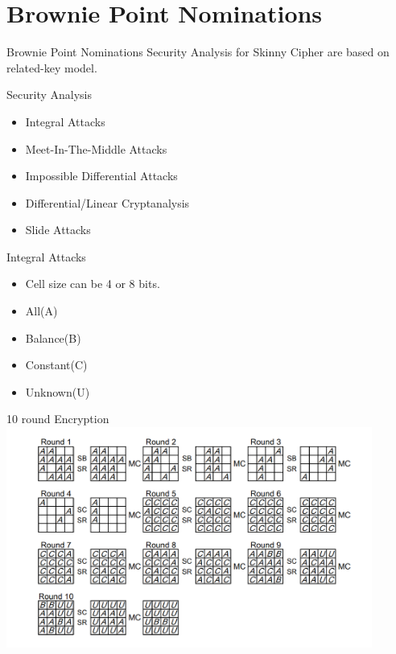 \section{Brownie Point Nominations}

\begin{frame}{Brownie Point Nominations}
	Security Analysis for Skinny Cipher are based on related-key model.
	\begin{block}{Security Analysis}
		
		\begin{itemize}[<+->]
			\item Integral Attacks
			\item Meet-In-The-Middle Attacks
			\item Impossible Differential Attacks
			\item  Differential/Linear Cryptanalysis
			\item Slide Attacks
		\end{itemize}
	\end{block}
\end{frame}


\begin{frame}{Integral Attacks}
	
	\begin{itemize}[<+>]
		\item Cell size can be 4 or 8 bits.
		\item All(A)
		\item Balance(B)
		\item Constant(C)
		\item Unknown(U)
	\end{itemize}
\end{frame}

\begin{frame}{10 round Encryption}
	\centering
	\includegraphics[width=12cm]{01.PNG}
	
\end{frame}

